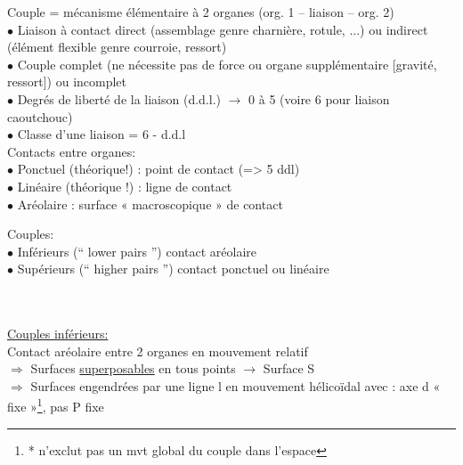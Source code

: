 {\color{orange}Couple} = mécanisme élémentaire à 2 organes (org. 1 – liaison – org. 2)\\

\noindent$\bullet$ Liaison à contact {\color{orange}direct} (assemblage genre charnière, rotule, ...) ou {\color{orange}indirect} (élément flexible genre courroie, ressort)\\
$\bullet$ Couple {\color{orange}complet} (ne nécessite pas de force ou organe supplémentaire [gravité, ressort]) ou {\color{orange}incomplet}\\
$\bullet$ Degrés de liberté de la liaison (d.d.l.) $\rightarrow$ 0 à 5 (voire 6 pour liaison caoutchouc)\\
$\bullet$ {\color{orange}Classe d'une liaison} = 6 - d.d.l\\

Contacts entre organes:\\
$\bullet$ {\color{orange}Ponctuel} (théorique!) : point de contact (=> 5 ddl)\\
$\bullet$ {\color{orange}Linéaire} (théorique !) : ligne de contact\\
$\bullet$ {\color{orange}Aréolaire} : surface « macroscopique » de contact\\

\begin{orangebox}
Couples:\\
$\bullet$ {\color{orange}Inférieurs} (“ lower pairs ”) contact aréolaire \\
$\bullet$ {\color{orange}Supérieurs} (“ higher pairs ”) contact ponctuel ou linéaire
\end{orangebox}\\\\

\underline{Couples inférieurs:}\\

\noindent Contact aréolaire entre 2 organes en mouvement relatif\\
$\Rightarrow$ Surfaces \underline{superposables} en tous points $\rightarrow$ Surface S\\
$\Rightarrow$ Surfaces engendrées par une ligne l en mouvement hélicoïdal avec : axe d « fixe »\footnote{* n’exclut pas un mvt global du couple dans l’espace }, pas P fixe


